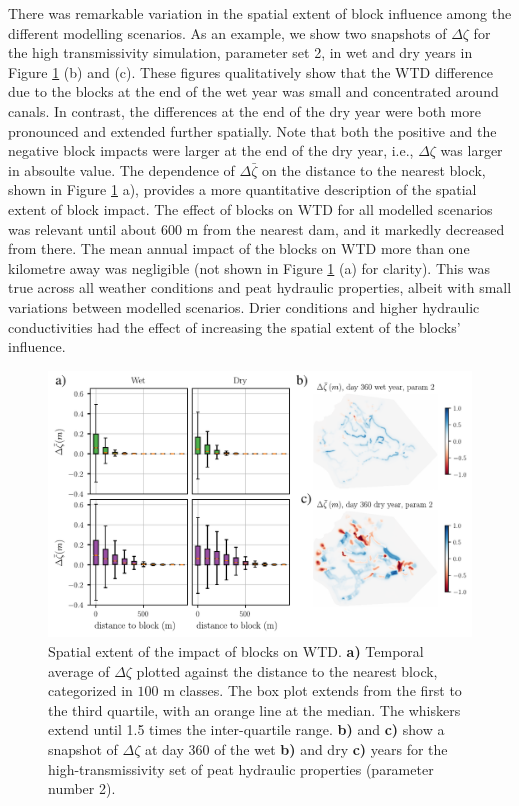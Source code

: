 \documentclass[bg, manuscript]{copernicus}
\begin{document}
There was remarkable variation in the spatial extent of  block influence among the different modelling scenarios.
As an example, we show two snapshots of $\Delta \zeta$ for the high transmissivity simulation, parameter set 2, in wet and dry years in Figure \ref{fig:spatial_extent_of_block_effect} (b) and (c).
These figures qualitatively show that the WTD difference due to the blocks at the end of the wet year was small and concentrated around canals.
In contrast, the differences at the end of the dry year were both more pronounced and extended further spatially.
Note that both the positive and the negative block impacts were larger at the end of the dry year, i.e., $\Delta \zeta$ was larger in absoulte value.
The dependence of $\Delta \bar{\zeta}$ on the distance to the nearest block, shown in Figure \ref{fig:spatial_extent_of_block_effect} a), provides a more quantitative description of the spatial extent of block impact.
The effect of blocks on WTD for all modelled scenarios was relevant until about $600$ \unit{m} from the nearest dam, and it markedly decreased from there.
The mean annual impact of the blocks on WTD more than one kilometre away was negligible (not shown in Figure \ref{fig:spatial_extent_of_block_effect} (a) for clarity).
This was true across all weather conditions and peat hydraulic properties, albeit with small variations between modelled scenarios.
Drier conditions and higher hydraulic conductivities had the effect of increasing the spatial extent of the blocks' influence.

\begin{figure}[t]
\includegraphics[width=12 cm]{figs/rasters_and_distance_to_blocks.pdf}
\caption{Spatial extent of the impact of blocks  on WTD. \textbf{a)} Temporal average of $\Delta \zeta$ plotted against the distance to the nearest block, categorized in $100$ \unit{m} classes. The box plot extends from the first to the third quartile, with an orange line at the median. The whiskers extend until 1.5 times the inter-quartile range. \textbf{b)} and \textbf{c)} show a snapshot of $\Delta \zeta$ at day $360$ of the wet \textbf{b)} and dry \textbf{c)} years for the high-transmissivity set of peat hydraulic properties (parameter number 2).}
\label{fig:spatial_extent_of_block_effect}
\end{figure}   
\end{document}

